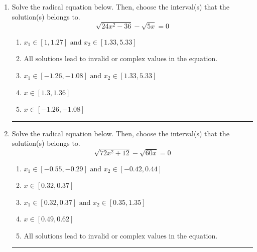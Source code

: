\documentclass[14pt]{extbook}
\newcommand{\litem}[1]{\item#1\hspace*{-1cm}\rule{\textwidth}{0.4pt}}
\begin{document}
\begin{enumerate}
{\begin{enumerate}[label=\Alph*.]
\end{enumerate} }
\litem{
Solve the radical equation below. Then, choose the interval(s) that the solution(s) belongs to.\[ \sqrt{24 x^2 - 36} - \sqrt{5 x} = 0 \]\begin{enumerate}[label=\Alph*.]
\item \( x_1 \in [1, 1.27] \text{ and } x_2 \in [1.33,5.33] \)
\item \( \text{All solutions lead to invalid or complex values in the equation.} \)
\item \( x_1 \in [-1.26, -1.08] \text{ and } x_2 \in [1.33,5.33] \)
\item \( x \in [1.3,1.36] \)
\item \( x \in [-1.26,-1.08] \)

\end{enumerate} }
\litem{
Solve the radical equation below. Then, choose the interval(s) that the solution(s) belongs to.\[ \sqrt{72 x^2 + 12} - \sqrt{60 x} = 0 \]\begin{enumerate}[label=\Alph*.]
\item \( x_1 \in [-0.55, -0.29] \text{ and } x_2 \in [-0.42,0.44] \)
\item \( x \in [0.32,0.37] \)
\item \( x_1 \in [0.32, 0.37] \text{ and } x_2 \in [0.35,1.35] \)
\item \( x \in [0.49,0.62] \)
\item \( \text{All solutions lead to invalid or complex values in the equation.} \)

\end{enumerate} }
\end{enumerate}
\end{document}
